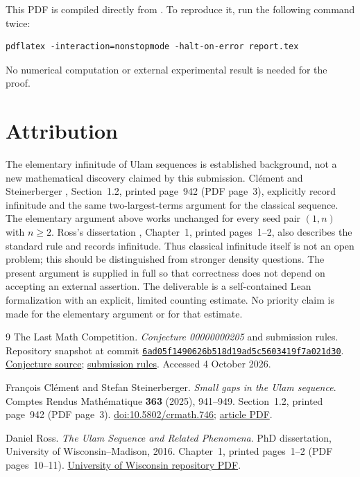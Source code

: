 \documentclass[11pt,a4paper]{article}
\newcommand{\lean}[1]{\texttt{\detokenize{#1}}}
\begin{document}
This PDF is compiled directly from \lean{report.tex}. To reproduce it, run the following command twice:
\begin{lstlisting}
pdflatex -interaction=nonstopmode -halt-on-error report.tex
\end{lstlisting}
No numerical computation or external experimental result is needed for the proof.

\section{Attribution}
The elementary infinitude of Ulam sequences is established background, not a new mathematical discovery claimed by this submission. Cl\'ement and Steinerberger \cite{clement}, Section~1.2, printed page~942 (PDF page~3), explicitly record infinitude and the same two-largest-terms argument for the classical sequence. The elementary argument above works unchanged for every seed pair $(1,n)$ with $n\ge2$. Ross's dissertation \cite{ross}, Chapter~1, printed pages~1--2, also describes the standard rule and records infinitude. Thus classical infinitude itself is not an open problem; this should be distinguished from stronger density questions. The present argument is supplied in full so that correctness does not depend on accepting an external assertion. The deliverable is a self-contained Lean formalization with an explicit, limited counting estimate. No priority claim is made for the elementary argument or for that estimate.

\begin{thebibliography}{9}
The Last Math Competition.
\emph{Conjecture 00000000205} and submission rules.
Repository snapshot at commit
\href{https://github.com/The-Last-Math-Competition/The-Last-Math-Competition/tree/6ad05f1490626b518d19ad5c5603419f7a021d30}{\texttt{6ad05f1490626b518d19ad5c5603419f7a021d30}}.
\href{https://github.com/The-Last-Math-Competition/The-Last-Math-Competition/blob/6ad05f1490626b518d19ad5c5603419f7a021d30/conjectures/00000000205.md}{Conjecture source};
\href{https://github.com/The-Last-Math-Competition/The-Last-Math-Competition/blob/6ad05f1490626b518d19ad5c5603419f7a021d30/README.md}{submission rules}.
Accessed 4 October 2026.

Fran\c{c}ois Cl\'ement and Stefan Steinerberger.
\emph{Small gaps in the Ulam sequence}.
Comptes Rendus Math\'ematique \textbf{363} (2025), 941--949.
Section~1.2, printed page~942 (PDF page~3).
\href{https://doi.org/10.5802/crmath.746}{doi:10.5802/crmath.746};
\href{https://comptes-rendus.academie-sciences.fr/mathematique/item/10.5802/crmath.746.pdf\#page=3}{article PDF}.

Daniel Ross.
\emph{The Ulam Sequence and Related Phenomena}.
PhD dissertation, University of Wisconsin--Madison, 2016.
Chapter~1, printed pages~1--2 (PDF pages~10--11).
\href{https://asset.library.wisc.edu/1711.dl/6DJJQWLMRTYIH8U/R/file-fb00e.pdf}{University of Wisconsin repository PDF}.
\end{thebibliography}
\end{document}

